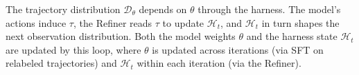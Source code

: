 The trajectory distribution $\mathcal{D}_\theta$ depends on $\theta$ through the harness. The model's actions induce $\tau$, the Refiner reads $\tau$ to update $\mathcal{H}_t$, and $\mathcal{H}_t$ in turn shapes the next observation distribution. Both the model weights $\theta$ and the harness state $\mathcal{H}_t$ are updated by this loop, where $\theta$ is updated across iterations (via SFT on relabeled trajectories) and $\mathcal{H}_t$ within each iteration (via the Refiner).
